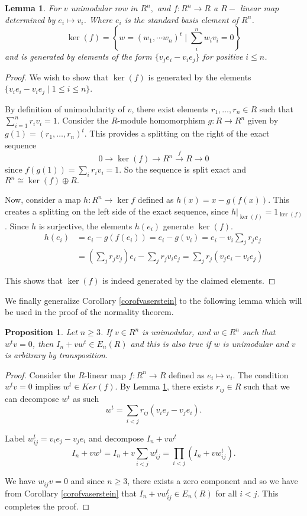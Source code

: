 \documentclass[12pt]{report}
\numberwithin{equation}{section}
\newcounter{dummy} \numberwithin{dummy}{section}
\newtheorem{lemma}[dummy]{Lemma}
\newtheorem{proposition}[dummy]{Proposition}
\begin{document}
		\begin{lemma}\label{kernelf}
			For $v$ unimodular row in $R^n,$ and $f: R^n \to R$ a $R-$ linear map determined by $e_i \mapsto v_i $. Where $e_i $ is the standard basis element of $R^n$.
			\[ \ker (f) =\left\{w=(w_1,\cdots w_n)^t \mid \sum_i^n w_i v_i =0\right\} \] and is generated by elements of the form \( \{ v_j e_i - v_i e_j \} \) for positive $i \leq n$.
			\end{lemma}
		\begin{proof}
			We wish to show that $\ker(f)$ is generated by the elements $\{v_ie_i - v_ie_j \mid 1 \leq i \leq n\}$.
			
			By definition of unimodularity of $v$, there exist elements $r_1, \ldots, r_n \in R$ such that $\sum_{i=1}^n r_iv_i = 1$. Consider the 
			$R$-module homomorphism $g: R \to R^n$ given by $g(1) = (r_1, \ldots, r_n)^t$. This provides a splitting 
			on the right of the exact sequence \[ 0 \to \ker (f ) \to R^n \xrightarrow{f} R \to 0 \] since $f(g(1))=\sum_i r_iv_i = 1$. So the sequence is split exact and $R^n \cong \ker (f) \oplus R.$
			
			Now, consider a map $h:R^n \to \ker f$ defined as  $h(x)=x - g(f(x))$. This creates a splitting on the left side of the 
			exact sequence, since  $h|_{\ker(f)} = 1_{\ker(f)}$. Since $h$ is surjective, the 
			elements $h(e_i)$ generate $\ker(f)$.
			\begin{align*}
				h(e_i) &= e_i - g(f(e_i)) = e_i - g(v_i) = e_i - v_i \sum_j r_je_j\\
				&= (\sum_j r_jv_j)e_i - \sum_j r_jv_ie_j = \sum_j r_j(v_je_i - v_ie_j)
			\end{align*}
			
			This shows that $\ker(f)$ is indeed generated by the claimed elements.
		\end{proof}
		
		We finally generalize Corollary \ref{corofvaserstein} to the following lemma which will be used in the proof of the normality theorem.
		\begin{proposition}\label{finalpropfornormality}
			Let $n \geq 3$. If $v \in R^n$ is unimodular, and $w \in R^n$ such that $w^tv = 0$, then $I_n + vw^t \in E_n(R)$ and this is also true if $w$ is unimodular and $v$ is arbitrary by transposition.
		\end{proposition}
		
		\begin{proof}
			Consider the $R$-linear map $f:R^n \to R$ defined as $e_i \mapsto v_i$. The condition $w^tv = 0 $ implies $w^t \in Ker(f)$. By Lemma \ref{kernelf}, there exists $r_{ij} \in R$ such that we can decompose $w^t$ as such
			\[
			w^t = \sum_{i<j} r_{ij}(v_ie_j - v_je_i).
			\]
			
			Label $w_{ij}^t = v_ie_j - v_je_i$ and decompose $I_n+vw^t$ 
			\[
			I_n + vw^t = I_n + v\sum_{i<j} w_{ij}^t = \prod_{i<j}(I_n + vw_{ij}^t).
			\]
			
			We have $w_{ij}v=0$ and since $n \geq 3$, there exists a zero component and so we have from Corollary \ref{corofvaserstein} that $I_n + vw_{ij}^t \in E_n(R)$ for all $i < j$. This completes the proof.
		\end{proof}
	
\end{document}
